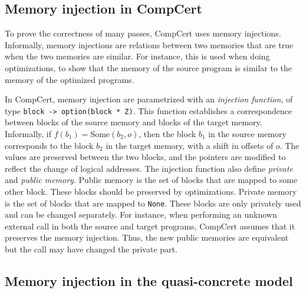 \label{sec:meminj}
\subsection{Memory injection in CompCert}

To prove the correctness of many passes, CompCert uses memory injections. Informally, memory injections are relations between two memories that are true when the two memories are similar. For instance, this is used when doing optimizations, to show that the memory of the source program is similar to the memory of the optimized programs.

In CompCert, memory injection are parametrized with an \textit{injection function}, of type \texttt{block -> option(block * Z)}. This function establishes a correspondence between blocks of the source memory and blocks of the target memory.
Informally, if $f(b_1)=\text{Some}(b_2,o)$, then the block $b_1$ in the source memory corresponds to the block $b_2$ in the target memory, with a shift in offsets of $o$. The values are preserved between the two blocks, and the pointers are modified to reflect the change of logical addresses.
The injection function also define \textit{private} and \textit{public memory}. Public memory is the set of blocks that are mapped to some other block. These blocks should be preserved by optimizations.
Private memory is the set of blocks that are mapped to \texttt{None}. These blocks are only privately used and can be changed separately.
For instance, when performing an unknown external call in both the source and target programs, CompCert assumes that it preserves the memory injection. Thus, the new public memories are equivalent but the call may have changed the private part.

\subsection{Memory injection in the quasi-concrete model}

